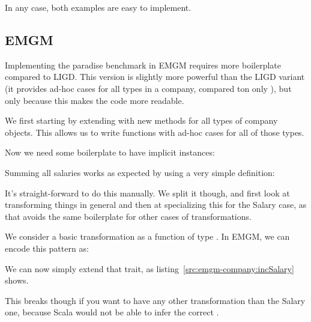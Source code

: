 In any case, both examples are easy to implement.


\subsection{EMGM}

Implementing the paradise benchmark in EMGM requires more boilerplate compared
to LIGD. This version is slightly more powerful than the LIGD variant (it
provides ad-hoc cases for all types in a company, compared ton only ),
but only because this makes the code more readable.

We first starting by extending  with new methods for all types of
company objects. This allows us to write functions with ad-hoc cases for all
of those types.



Now we need some boilerplate to have implicit  instances:


\begin{example}
Summing all salaries works as expected by using a very simple definition:

\end{example}

\begin{example}
It's straight-forward to do this manually. We split it though, and first look
at transforming things in general and then at specializing this for the Salary
case, as that avoids the same boilerplate for other cases of transformations.

We consider a basic transformation as a function of type . In EMGM,
we can encode this pattern as:


We can now simply extend that trait, as listing~\ref{src:emgm-company:incSalary} shows.


This breaks though if you want to have any other transformation than the Salary
one, because Scala would not be able to infer the correct .
\end{example}


